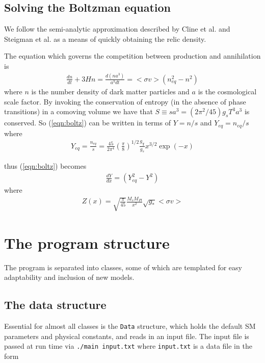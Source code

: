 \subsection{Solving the Boltzman equation}

We follow the semi-analytic approximation described by Cline et al. \cite{Cline2013} and Steigman et al. \cite{Steigman2012} as a means of quickly obtaining the relic density.

The equation which governs the competition between production and annihilation is
\begin{align}
\frac{dn}{dt}+3Hn=\frac{d(na^3)}{a^3dt}=<\!\sigma v\! >(n_{eq}^2-n^2)\label{eqn:boltz}
\end{align}
where $n$ is the number density of dark matter particles and $a$ is the cosmological scale factor.  By invoking the conservation of entropy (in the absence of phase transitions) in a comoving volume we have that $S\equiv sa^3=(2\pi^2/45)g_sT^3a^3$ is conserved.  So (\ref{eqn:boltz}) can be written in terms of $Y=n/s$ and $Y_{eq}=n_{eq}/s$ where
\begin{align}
Y_{eq}=\frac{n_{eq}}{s}=\frac{45}{2\pi^4}\left(\frac{\pi}{8}\right)^{1/2}\frac{g_{\chi}}{g_s}x^{3/2}\exp(-x)
\end{align}

thus (\ref{eqn:boltz}) becomes
\begin{align}
\frac{dY}{dx}=\left(Y_{eq}^2-Y^2\right)
\end{align}
where
\begin{align}
Z(x)=\sqrt{\frac{\pi}{45}} \frac{M_sM_{Pl}}{x^2} \sqrt{g_{*}}<\!\sigma v\! >
\end{align}

\section{The program structure}

The program is separated into classes, some of which are templated for easy adaptability and inclusion of new models.  

\subsection{The data structure}
Essential for almost all classes is the \lstinline{Data} structure, which holds the default SM parameters and physical constants, and reads in an input file.  The input file is passed at run time via \lstinline{./main input.txt} where \lstinline{input.txt} is a data file in the form

